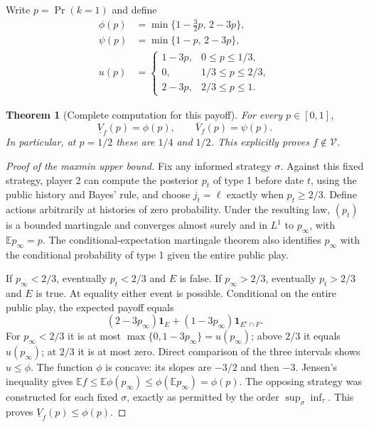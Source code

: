 \documentclass[11pt,a4paper]{article}
\newcommand{\E}{\mathbb E}
\newcommand{\ind}{\mathbf 1}
\newtheorem{theorem}{Theorem}[section]
\theoremstyle{definition}
\theoremstyle{remark}
\begin{document}
Write $p=\Pr(k=1)$ and define
\begin{align*}
 \phi(p)&=\min\{1-\tfrac32p,\,2-3p\},\\
 \psi(p)&=\min\{1-p,\,2-3p\},\\
 u(p)&=\begin{cases}
 1-3p,&0\leq p\leq1/3,\\
 0,&1/3\leq p\leq2/3,\\
 2-3p,&2/3\leq p\leq1.
 \end{cases}
\end{align*}
\begin{theorem}[Complete computation for this payoff]
For every $p\in[0,1]$,
\[
 \underline V_f(p)=\phi(p),\qquad
 \overline V_f(p)=\psi(p).
\]
In particular, at $p=1/2$ these are $1/4$ and $1/2$. This explicitly proves $f\notin\mathcal V$.
\end{theorem}
\begin{proof}[Proof of the maxmin upper bound]
Fix any informed strategy $\sigma$. Against this fixed strategy, player 2 can compute the posterior $p_t$ of type 1 before date $t$, using the public history and Bayes' rule, and choose $j_t=\ell$ exactly when $p_t\geq2/3$. Define actions arbitrarily at histories of zero probability. Under the resulting law, $(p_t)$ is a bounded martingale and converges almost surely and in $L^1$ to $p_\infty$, with $\E p_\infty=p$. The conditional-expectation martingale theorem also identifies $p_\infty$ with the conditional probability of type 1 given the entire public play.

If $p_\infty<2/3$, eventually $p_t<2/3$ and $E$ is false. If $p_\infty>2/3$, eventually $p_t>2/3$ and $E$ is true. At equality either event is possible. Conditional on the entire public play, the expected payoff equals
\[
 (2-3p_\infty)\ind_E+(1-3p_\infty)\ind_{E^c\cap F}.
\]
For $p_\infty<2/3$ it is at most $\max\{0,1-3p_\infty\}=u(p_\infty)$; above $2/3$ it equals $u(p_\infty)$; at $2/3$ it is at most zero. Direct comparison of the three intervals shows $u\leq\phi$. The function $\phi$ is concave: its slopes are $-3/2$ and then $-3$. Jensen's inequality gives
$\E f\leq\E\phi(p_\infty)\leq\phi(\E p_\infty)=\phi(p)$.
The opposing strategy was constructed for each fixed $\sigma$, exactly as permitted by the order $\sup_\sigma\inf_\tau$. This proves $\underline V_f(p)\leq\phi(p)$.
\end{proof}
\end{document}
